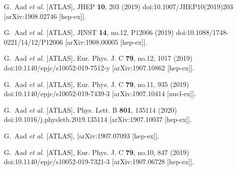 \begin{thebibliography}{9}
G.~Aad \textit{et al.} [ATLAS],
JHEP \textbf{10}, 203 (2019)
doi:10.1007/JHEP10(2019)203
[arXiv:1908.02746 [hep-ex]].

G.~Aad \textit{et al.} [ATLAS],
JINST \textbf{14}, no.12, P12006 (2019)
doi:10.1088/1748-0221/14/12/P12006
[arXiv:1908.00005 [hep-ex]].

G.~Aad \textit{et al.} [ATLAS],
Eur. Phys. J. C \textbf{79}, no.12, 1017 (2019)
doi:10.1140/epjc/s10052-019-7512-y
[arXiv:1907.10862 [hep-ex]].

G.~Aad \textit{et al.} [ATLAS],
Eur. Phys. J. C \textbf{79}, no.11, 935 (2019)
doi:10.1140/epjc/s10052-019-7439-3
[arXiv:1907.10414 [nucl-ex]].

G.~Aad \textit{et al.} [ATLAS],
Phys. Lett. B \textbf{801}, 135114 (2020)
doi:10.1016/j.physletb.2019.135114
[arXiv:1907.10037 [hep-ex]].

G.~Aad \textit{et al.} [ATLAS],
[arXiv:1907.07093 [hep-ex]].

G.~Aad \textit{et al.} [ATLAS],
Eur. Phys. J. C \textbf{79}, no.10, 847 (2019)
doi:10.1140/epjc/s10052-019-7321-3
[arXiv:1907.06728 [hep-ex]].


\end{thebibliography}
